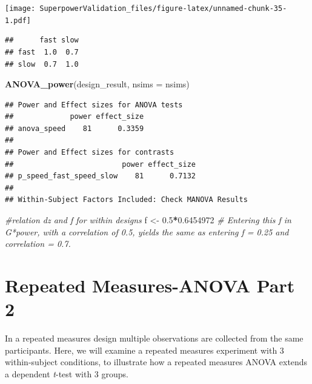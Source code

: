 \documentclass[]{book}
\newenvironment{Shaded}{\begin{snugshade}}{\end{snugshade}}
\newcommand{\CommentTok}[1]{\textcolor[rgb]{0.56,0.35,0.01}{\textit{#1}}}
\newcommand{\DataTypeTok}[1]{\textcolor[rgb]{0.13,0.29,0.53}{#1}}
\newcommand{\FloatTok}[1]{\textcolor[rgb]{0.00,0.00,0.81}{#1}}
\newcommand{\KeywordTok}[1]{\textcolor[rgb]{0.13,0.29,0.53}{\textbf{#1}}}
\newcommand{\NormalTok}[1]{#1}
\newcommand{\OperatorTok}[1]{\textcolor[rgb]{0.81,0.36,0.00}{\textbf{#1}}}
\newcommand{\StringTok}[1]{\textcolor[rgb]{0.31,0.60,0.02}{#1}}
\begin{document}
\texttt{[image: SuperpowerValidation\_files/figure-latex/unnamed-chunk-35-1.pdf]}

\begin{Shaded}
\end{Shaded}

\begin{verbatim}
##      fast slow
## fast  1.0  0.7
## slow  0.7  1.0
\end{verbatim}

\begin{Shaded}
\begin{Highlighting}[]
\KeywordTok{ANOVA_power}\NormalTok{(design_result, }\DataTypeTok{nsims =}\NormalTok{ nsims)}
\end{Highlighting}
\end{Shaded}

\begin{verbatim}
## Power and Effect sizes for ANOVA tests
##             power effect_size
## anova_speed    81      0.3359
## 
## Power and Effect sizes for contrasts
##                         power effect_size
## p_speed_fast_speed_slow    81      0.7132
## 
## Within-Subject Factors Included: Check MANOVA Results
\end{verbatim}

\begin{Shaded}
\begin{Highlighting}[]
\CommentTok{#relation dz and f for within designs }
\NormalTok{f <-}\StringTok{ }\FloatTok{0.5}\OperatorTok{*}\FloatTok{0.6454972}
\CommentTok{# Entering this f in G*power, with a correlation of 0.5, yields the same as entering f = 0.25 and correlation = 0.7. }
\end{Highlighting}
\end{Shaded}

\hypertarget{repeated-measures-anova-part-2}{%
\chapter{Repeated Measures-ANOVA Part 2}\label{repeated-measures-anova-part-2}}

In a repeated measures design multiple observations are collected from the same participants. Here, we will examine a repeated measures experiment with 3 within-subject conditions, to illustrate how a repeated measures ANOVA extends a dependent \emph{t}-test with 3 groups.
\end{document}
